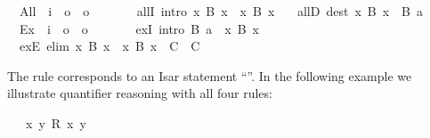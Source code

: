 \begin{isabellebody}
\isanewline
\ \ All\ {\isacharcolon}{\isacharcolon}\ {\isachardoublequoteopen}{\isacharparenleft}i\ {\isasymRightarrow}\ o{\isacharparenright}\ {\isasymRightarrow}\ o{\isachardoublequoteclose}\ \ {\isacharparenleft}\ {\isachardoublequoteopen}{\isasymforall}{\isachardoublequoteclose}\ {}{}{\isacharparenright}\ \isanewline
\ \ allI\ {\isacharbrackleft}intro{\isacharbrackright}{\isacharcolon}\ {\isachardoublequoteopen}{\isacharparenleft}{\isasymAnd}x{\isachardot}\ B\ x{\isacharparenright}\ {\isasymLongrightarrow}\ {\isasymforall}x{\isachardot}\ B\ x{\isachardoublequoteclose}\ \isanewline
\ \ allD\ {\isacharbrackleft}dest{\isacharbrackright}{\isacharcolon}\ {\isachardoublequoteopen}{\isacharparenleft}{\isasymforall}x{\isachardot}\ B\ x{\isacharparenright}\ {\isasymLongrightarrow}\ B\ a{\isachardoublequoteclose}\isanewline
\isanewline
{}\isamarkupfalse%
\isanewline
\ \ Ex\ {\isacharcolon}{\isacharcolon}\ {\isachardoublequoteopen}{\isacharparenleft}i\ {\isasymRightarrow}\ o{\isacharparenright}\ {\isasymRightarrow}\ o{\isachardoublequoteclose}\ \ {\isacharparenleft}\ {\isachardoublequoteopen}{\isasymexists}{\isachardoublequoteclose}\ {}{}{\isacharparenright}\ \isanewline
\ \ exI\ {\isacharbrackleft}intro{\isacharbrackright}{\isacharcolon}\ {\isachardoublequoteopen}B\ a\ {\isasymLongrightarrow}\ {\isacharparenleft}{\isasymexists}x{\isachardot}\ B\ x{\isacharparenright}{\isachardoublequoteclose}\ \isanewline
\ \ exE\ {\isacharbrackleft}elim{\isacharbrackright}{\isacharcolon}\ {\isachardoublequoteopen}{\isacharparenleft}{\isasymexists}x{\isachardot}\ B\ x{\isacharparenright}\ {\isasymLongrightarrow}\ {\isacharparenleft}{\isasymAnd}x{\isachardot}\ B\ x\ {\isasymLongrightarrow}\ C{\isacharparenright}\ {\isasymLongrightarrow}\ C{\isachardoublequoteclose}%
\begin{isamarkuptext}%
\noindent The  rule corresponds to an Isar statement
  ``''.  In the
  following example we illustrate quantifier reasoning with all four
  rules:%
\end{isamarkuptext}%
\isamarkuptrue%
\isamarkupfalse%
\isanewline
\ \ \ {\isachardoublequoteopen}{\isasymexists}x{\isachardot}\ {\isasymforall}y{\isachardot}\ R\ x\ y{\isachardoublequoteclose}\isanewline

\end{isabellebody}
